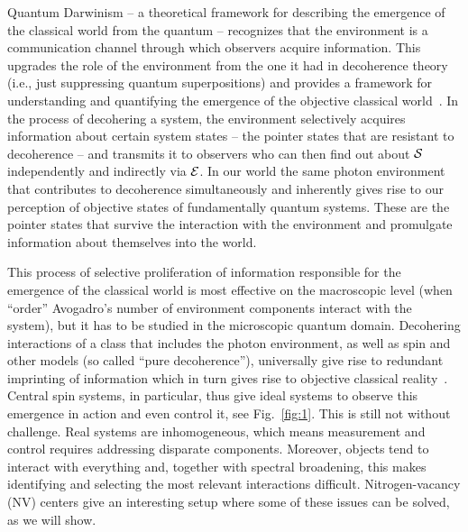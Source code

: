 \documentclass[aps,prl,floatfix,twocolumn,footinbib,superscriptaddress]{revtex4-1}
\begin{document}
\maketitle

Quantum Darwinism -- a theoretical framework for describing the emergence of the classical world from the quantum -- recognizes that the environment is a communication channel through which observers acquire information. This upgrades the role of the environment from the one it had in decoherence theory (i.e., just suppressing quantum superpositions) and provides a framework for understanding and quantifying the emergence of the objective classical world~\cite{Ollivier04-1,Ollivier05-1,Blume-Kohout2005,zur09,Zwolak13-1,Zurek14-1,Zwolak14,Pawel15,zwolak16,Zwolak17-1,Gerardo18}. In the process of decohering a system, the environment selectively acquires information about certain system states -- the pointer states \cite{Zurek81} that are resistant to decoherence -- and transmits it to observers who can then find out about $\S$ independently and indirectly via $\E$. In our world the same photon environment that contributes to decoherence simultaneously and inherently gives rise to our perception of objective states of fundamentally quantum systems. These are the pointer states that survive the interaction with the environment and promulgate information about themselves into the world.

This process of selective proliferation of information responsible for the emergence of the classical world is most effective on the macroscopic level (when ``order'' Avogadro's number of environment components interact with the system), but it has to be studied in the microscopic quantum domain. Decohering interactions of a class that includes the photon environment, as well as spin and other models (so called ``pure decoherence''), universally give rise to redundant imprinting of information which in turn gives rise to objective classical reality~\cite{Zwolak14,zwolak16}.  Central spin systems, in particular, thus give ideal systems to observe this emergence in action and even control it, see Fig.~\ref{fig:1}. This is still not without challenge. Real systems are inhomogeneous, which means measurement and control requires addressing disparate components. Moreover, objects tend to interact with everything and, together with spectral broadening, this makes identifying and selecting the most relevant interactions difficult. Nitrogen-vacancy (NV) centers give an interesting setup where some of these issues can be solved, as we will show.  
\end{document}
